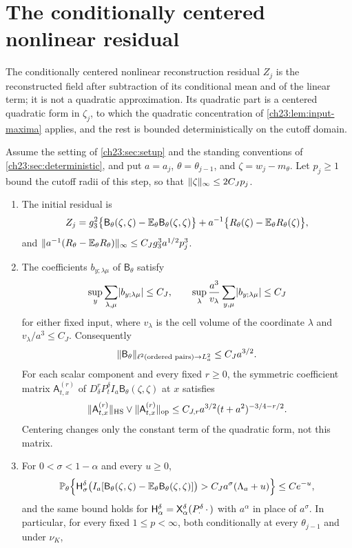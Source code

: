 \section{The conditionally centered nonlinear residual}\label{ch23:sec:residual}

The conditionally centered nonlinear reconstruction residual $Z_j$ is the reconstructed field after subtraction of its conditional mean and of the linear term; it is not a quadratic approximation. Its quadratic part is a centered quadratic form in $\zeta_j$, to which the quadratic concentration of \cref{ch23:lem:input-maxima} applies, and the rest is bounded deterministically on the cutoff domain.

\begin{theorem}\label{ch23:thm:centered-residual}
Assume the setting of \cref{ch23:sec:setup} and the standing conventions of \cref{ch23:sec:deterministic}, and put $a=a_j$, $\theta=\theta_{j-1}$, and $\zeta=w_j-m_\theta$. Let $p_j\ge1$ bound the cutoff radii of this step, so that $\lVert \zeta\rVert_\infty\le2C_Jp_j$.
\begin{enumerate}
\item The initial residual is
\[
 Z_j=g_3^2\bigl\{\mathsf B_\theta(\zeta,\zeta)-\mathbb E_\theta\mathsf B_\theta(\zeta,\zeta)\bigr\}+a^{-1}\bigl\{R_\theta(\zeta)-\mathbb E_\theta R_\theta(\zeta)\bigr\},
\]
and $\lVert a^{-1}(R_\theta-\mathbb E_\theta R_\theta)\rVert_\infty\le C_Jg_3^3a^{1/2}p_j^3$.
\item The coefficients $b_{y;\lambda\mu}$ of $\mathsf B_\theta$ satisfy
\[
 \sup_y\sum_{\lambda,\mu}\lvert b_{y;\lambda\mu}\rvert\le C_J,\qquad
 \sup_\lambda\frac{a^3}{v_\lambda}\sum_{y,\mu}\lvert b_{y;\lambda\mu}\rvert\le C_J
\]
for either fixed input, where $v_\lambda$ is the cell volume of the coordinate $\lambda$ and $v_\lambda/a^3\le C_J$. Consequently
\[
 \lVert \mathsf B_\theta\rVert_{\ell^2(\text{ordered pairs})\to L_a^2}\le C_Ja^{3/2}.
\]
For each scalar component and every fixed $r\ge0$, the symmetric coefficient matrix $\mathsf A_{t,x}^{(r)}$ of $D_\delta^rP_t^\delta I_a\mathsf B_\theta(\zeta,\zeta)$ at $x$ satisfies
\[
 \lVert \mathsf A_{t,x}^{(r)}\rVert_{\mathrm{HS}}\vee\lVert \mathsf A_{t,x}^{(r)}\rVert_{\mathrm{op}}\le C_{J,r}a^{3/2}(t+a^2)^{-3/4-r/2}.
\]
Centering changes only the constant term of the quadratic form, not this matrix.
\item For $0<\sigma<1-\alpha$ and every $u\ge0$,
\[
 \mathbb P_\theta\Bigl\{\mathsf H_{\sigma}^{\delta}\bigl(I_a[\mathsf B_\theta(\zeta,\zeta)-\mathbb E_\theta\mathsf B_\theta(\zeta,\zeta)]\bigr)>C_Ja^\sigma(\Lambda_a+u)\Bigr\}\le Ce^{-u},
\]
and the same bound holds for $\mathsf H_{\alpha}^{\delta}=\mathsf X_{\alpha}^{\delta}(P_\cdot^\delta\,\cdot\,)$ with $a^\alpha$ in place of $a^\sigma$. In particular, for every fixed $1\le p<\infty$, both conditionally at every $\theta_{j-1}$ and under $\nu_K$,

\end{enumerate}
\end{theorem}
